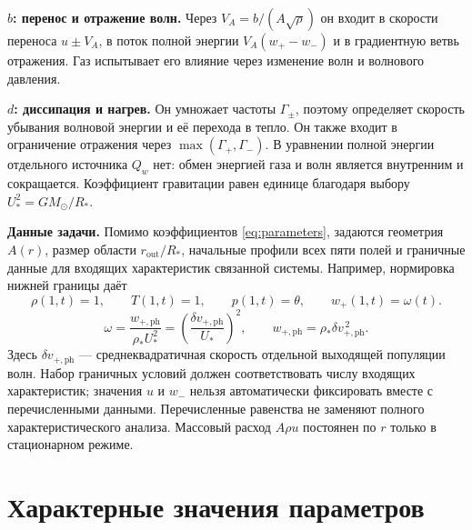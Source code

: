 \documentclass[11pt,a4paper]{article}
\newcommand{\ph}{\mathrm{ph}}
\begin{document}
\textbf{$b$: перенос и отражение волн.}
Через $V_A=b/(A\sqrt\rho)$ он входит в скорости переноса $u\pm V_A$,
в поток полной энергии $V_A(w_+-w_-)$ и в градиентную ветвь отражения.
Газ испытывает его влияние через изменение волн и волнового давления.

\textbf{$d$: диссипация и нагрев.}
Он умножает частоты $\Gamma_\pm$, поэтому определяет скорость
убывания волновой энергии и её перехода в тепло.
Он также входит в ограничение отражения через $\max(\Gamma_+,\Gamma_-)$.
В уравнении полной энергии отдельного источника $Q_w$ нет:
обмен энергией газа и волн является внутренним и сокращается.
Коэффициент гравитации равен единице благодаря выбору $U_*^2=GM_\odot/R_*$.

\textbf{Данные задачи.}
Помимо коэффициентов \eqref{eq:parameters}, задаются геометрия $A(r)$,
размер области $r_{\mathrm{out}}/R_*$, начальные профили всех пяти полей
и граничные данные для входящих характеристик связанной системы.
Например, нормировка нижней границы даёт
\[
 \rho(1,t)=1,\qquad T(1,t)=1,\qquad p(1,t)=\theta,\qquad
 w_+(1,t)=\omega(t).
\]
\[
 \omega=\frac{w_{+,\ph}}{\rho_*U_*^2}
        =\left(\frac{\delta v_{+,\ph}}{U_*}\right)^2,
 \qquad w_{+,\ph}=\rho_*\delta v_{+,\ph}^{\,2}.
\]
Здесь $\delta v_{+,\ph}$ --- среднеквадратичная скорость
отдельной выходящей популяции волн. Набор граничных условий
должен соответствовать числу входящих характеристик;
значения $u$ и $w_-$ нельзя автоматически фиксировать вместе
с перечисленными данными. Перечисленные равенства не заменяют
полного характеристического анализа.
Массовый расход $A\rho u$ постоянен по $r$ только в стационарном режиме.

\section{Характерные значения параметров}
\end{document}
